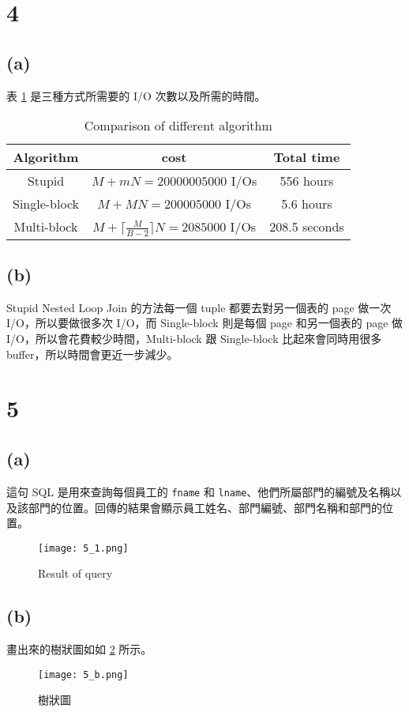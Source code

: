 \documentclass{article}
\begin{document}
\section*{4}
\subsection*{(a)}
表 \ref{tab:4_a} 是三種方式所需要的 I/O 次數以及所需的時間。
\begin{table}[H]
    \centering
    \begin{tabular}{ccc}
    \toprule
    \textbf{Algorithm} & \textbf{cost} & \textbf{Total time} \\
    \midrule
    Stupid & $M+mN = 20000005000$ I/Os & 556 hours \\
    Single-block & $M+MN = 200005000$ I/Os & 5.6 hours \\
    Multi-block & $M+ \lceil \frac{M}{B-2}\rceil N = 2085000$ I/Os & 208.5 seconds \\
    \bottomrule
    \end{tabular}
    \caption{Comparison of different algorithm}
    \label{tab:4_a}
\end{table}

\subsection*{(b)}
Stupid Nested Loop Join 的方法每一個 tuple 都要去對另一個表的 page 做一次 I/O，所以要做很多次 I/O，而 Single-block 則是每個 page 和另一個表的 page 做 I/O，所以會花費較少時間，Multi-block 跟 Single-block 比起來會同時用很多 buffer，所以時間會更近一步減少。

\section*{5}
\subsection*{(a)}
這句 SQL 是用來查詢每個員工的 \texttt{fname} 和 \texttt{lname}、他們所屬部門的編號及名稱以及該部門的位置。回傳的結果會顯示員工姓名、部門編號、部門名稱和部門的位置。
\begin{figure}[H]
    \centering
    \texttt{[image: 5\_1.png]}
    \caption{Result of query}
    \label{fig:5_a}
\end{figure}

\subsection*{(b)}
畫出來的樹狀圖如如 \ref{fig:5_b} 所示。
\begin{figure}[H]
    \centering
    \texttt{[image: 5\_b.png]}
    \caption{樹狀圖}
    \label{fig:5_b}
\end{figure}
\end{document}
